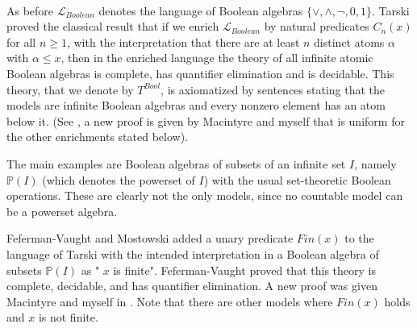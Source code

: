 \documentclass[12pt]{amsart}
\def\P{\mathbb{P}}
\numberwithin{equation}{section}
\begin{document}
\

\medskip

As before $\mathcal{L}_{Boolean}$ denotes the language of Boolean algebras $\{\vee,\wedge,\neg,0,1\}$. Tarski proved the classical result that if we enrich $\mathcal{L}_{Boolean}$ by natural predicates $C_n(x)$ for all $n\geq 1$, with the interpretation that there are at least $n$ distinct atoms $\alpha$ with $\alpha\leq x$, then in the enriched language the 
theory of all infinite atomic Boolean algebras is complete, has quantifier elimination and is decidable. This theory, that we denote by $T^{Bool}$, 
is axiomatized by sentences stating that the models are infinite Boolean algebras and every nonzero element has an atom below it.
(See \cite[Theorem 16,pp.70]{KK}, a new proof is given by Macintyre and myself \cite{DM-bool} that is uniform for the other enrichments stated below). 

The main examples are Boolean algebras of subsets of an infinite set $I$, namely $\P(I)$ (which denotes the powerset of $I$) with the usual set-theoretic Boolean operations. 
These are clearly not the only models, since no countable model can be a powerset algebra. 

Feferman-Vaught \cite{FV} and Mostowski added a unary predicate $Fin(x)$ to the 
language of Tarski 
with the intended interpretation in a Boolean algebra of subsets $\P(I)$ as " $x$ is finite". Feferman-Vaught \cite{FV} proved that this theory is complete, decidable, and has quantifier elimination. A new proof was given Macintyre and myself 
in \cite{DM-bool}. Note that there are other models where $Fin(x)$ holds and $x$ is not finite.
\end{document}
